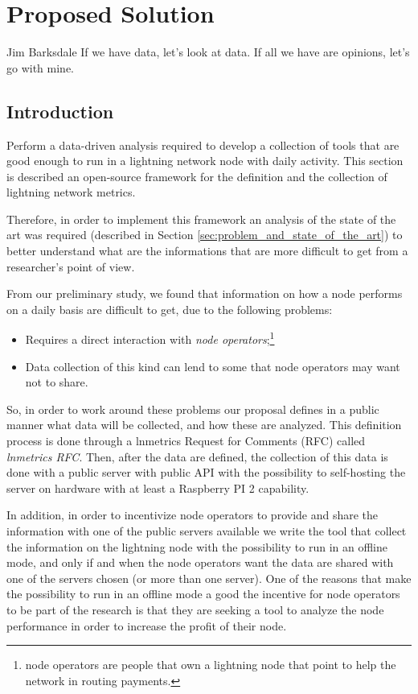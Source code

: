 \chapter{Proposed Solution}

\begin{chapquote}{Jim Barksdale}
If we have data, let’s look at data. If all we have are opinions, let’s go with mine.
\end{chapquote}

\section{Introduction}

Perform a data-driven analysis required to develop a collection of tools
that are good enough to run in a lightning network node with daily activity. 
This section is described an open-source framework for the definition and 
the collection of lightning network metrics.

Therefore, in order to implement this framework an analysis of the state 
of the art was required (described in Section \ref{sec:problem_and_state_of_the_art})
to better understand what are the informations that are more difficult 
to get from a researcher's point of view.

From our preliminary study, we found that information on how a node performs 
on a daily basis are difficult to get, due to the following problems:
\begin{itemize}
    \item Requires a direct interaction with \emph{node operators};\footnote{node operators are people that own a lightning node that point to 
    help the network in routing payments.}
    \item Data collection of this kind can lend to some
    that node operators may want not to share.
\end{itemize}

So, in order to work around these problems our proposal defines in a 
public manner what data will be collected, and how these are analyzed. This 
definition process is done through a lnmetrics Request for Comments (RFC) 
called \emph{lnmetrics RFC}. Then, after the data are defined, the collection 
of this data is done with a public server with public API with the possibility 
to self-hosting the server on hardware with at least a Raspberry PI 2 capability.

In addition, in order to incentivize node operators to provide and share the 
information with one of the public servers available we write the tool that 
collect the information on the lightning node with the possibility to run 
in an offline mode, and only if and when the node operators want the data 
are shared with one of the servers chosen (or more than one server).
One of the reasons that make the possibility to run in an offline mode a good
the incentive for node operators to be part of the research is that they 
are seeking a tool to analyze the node performance in order to increase the profit of
their node.

